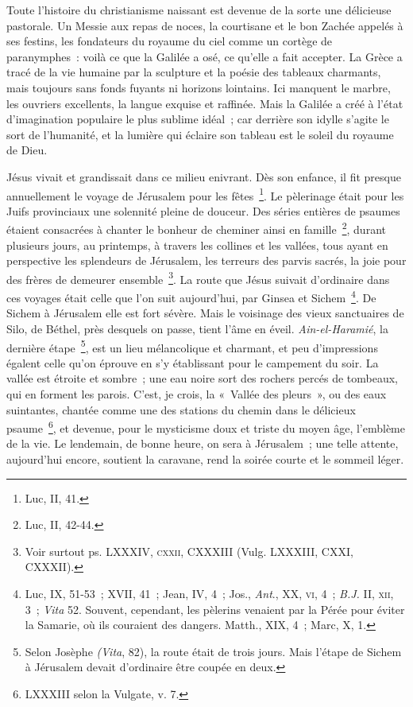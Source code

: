 \documentclass[french,twoside]{book} %
\begin{document}
Toute l’histoire du christianisme naissant est devenue de la sorte une délicieuse pastorale. Un Messie aux repas de noces, la courtisane et le bon Zachée appelés à ses festins, les fondateurs du royaume du ciel comme un cortège de paranymphes : voilà ce que la Galilée a osé, ce qu’elle a fait accepter. La Grèce a tracé de la vie humaine par la sculpture et la poésie des tableaux charmants, mais toujours sans fonds fuyants ni horizons lointains. Ici manquent le marbre, les ouvriers excellents, la langue exquise et raffinée. Mais la Galilée a créé à l’état d’imagination populaire le plus sublime idéal ; car derrière son idylle s’agite le sort de l’humanité, et la lumière qui éclaire son tableau est le soleil du royaume de Dieu.\par
Jésus vivait et grandissait dans ce milieu enivrant. Dès son enfance, il fit presque annuellement le voyage de Jérusalem pour les fêtes \footnote{Luc, II, 41.}. Le pèlerinage était pour les Juifs provinciaux une solennité pleine de douceur. Des séries entières de psaumes étaient consacrées à chanter le bonheur de cheminer ainsi en famille \footnote{Luc, II, 42-44.}, durant plusieurs jours, au printemps, à travers les collines et les vallées, tous ayant en perspective les splendeurs de Jérusalem, les terreurs des parvis sacrés, la joie pour des frères de demeurer ensemble \footnote{ Voir surtout ps. LXXXIV, \textsc{cxxii}, CXXXIII (Vulg. LXXXIII, CXXI, CXXXII).}. La route que Jésus suivait d’ordinaire dans ces voyages était celle que l’on suit aujourd’hui, par Ginsea et Sichem \footnote{ Luc, IX, 51-53 ; XVII, 41 ; Jean, IV, 4 ; Jos., {\itshape Ant}., XX, \textsc{vi}, 4 ; {\itshape B.J.} II, \textsc{xii}, 3 ; {\itshape Vita} 52. Souvent, cependant, les pèlerins venaient par la Pérée pour éviter la Samarie, où ils couraient des dangers. Matth., XIX, 4 ; Marc, X, 1.}. De Sichem à Jérusalem elle est fort sévère. Mais le voisinage des vieux sanctuaires de Silo, de Béthel, près desquels on passe, tient l’âme en éveil. {\itshape Ain-el-Haramié}, la dernière étape \footnote{ Selon Josèphe {\itshape (Vita}, 82), la route était de trois jours. Mais l’étape de Sichem à Jérusalem devait d’ordinaire être coupée en deux.}, est un lieu mélancolique et charmant, et peu d’impressions égalent celle qu’on éprouve en s’y établissant pour le campement du soir. La vallée est étroite et sombre ; une eau noire sort des rochers percés de tombeaux, qui en forment les parois. C’est, je crois, la « Vallée des pleurs », ou des eaux suintantes, chantée comme une des stations du chemin dans le délicieux psaume \footnote{LXXXIII selon la Vulgate, v. 7.}, et devenue, pour le mysticisme doux et triste du moyen âge, l’emblème de la vie. Le lendemain, de bonne heure, on sera à Jérusalem ; une telle attente, aujourd’hui encore, soutient la caravane, rend la soirée courte et le sommeil léger.\par
\end{document}
